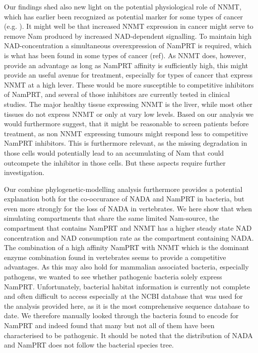 Our findings shed also new light on the potential physiological role of NNMT, which has earlier been recognized as potential marker for some types of cancer (e.g. \cite{Okamura1998}). It might well be that increased NNMT expression in cancer might serve to remove Nam produced by increased NAD-dependent signalling. To maintain high NAD-concentration a simultaneous overexpression of NamPRT is required, which is what has been found in some types of cancer (ref).  As NNMT does, however, provide an advantage as long as NamPRT affinity is sufficiently high, this might provide an useful avenue for treatment, especially for types of cancer that express NNMT at a high lever. These would be more susceptible to competitive inhibitors of NamPRT, and several of those inhibitors are currently tested in clinical studies. The major healthy tissue expressing NNMT is the liver, while most other tissues do not express NNMT or only at vary low levels.  Based on our analysis we would furthermore suggest, that it might be reasonable to screen patients before treatment, as non NNMT expressing tumours might respond less to competitive NamPRT inhibitors. This is furthermore relevant, as the missing degradation in those cells would potentially lead to an accumulating of Nam that could outcompete the inhibitor in those cells. But these aspects require further investigation.

Our combine phylogenetic-modelling analysis furthermore provides a potential explanation both for the co-occurance of NADA and NamPRT in bacteria, but even more strongly for the loss of NADA in vertebrates. We here show that when  simulating compartments that share the same limited Nam-source, the compartment  that contains NamPRT and NNMT has a higher steady state NAD concentration and NAD consumption rate as the compartment containing NADA. The combination of a high affinity NamPRT with NNMT which is  the dominant enzyme combination found in vertebrates seems to provide a competitive advantages. As this may also hold for mammalian associated bacteria, especially pathogens, we wanted to see whether pathogenic bacteria solely express NamPRT. Unfortunately, bacterial habitat information is currently not complete and often difficult to access especially at the NCBI database that was used for the analysis provided here, as it is the most comprehensive sequence database to date. We therefore manually looked through the bacteria found to encode for NamPRT and indeed found that many but not all of them have been characterised to be pathogenic. It should be noted that the distribution of NADA and NamPRT does not follow the bacterial species tree. 

